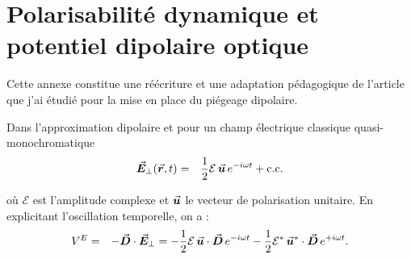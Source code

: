 \chapter{Polarisabilité dynamique et potentiel dipolaire optique}
\label{annex:dipolaire}
\minitoc

Cette annexe constitue une réécriture et une adaptation pédagogique de l’article \cite{Le_Kien_2013} que j’ai étudié pour la mise en place du piégeage dipolaire.

\medskip


Dans l’approximation dipolaire et pour un champ électrique classique quasi-monochromatique
\begin{eqnarray}
	\vec{{\bm{E}}}_\perp(\vec{{\bm{r}}},t) & = &\frac{1}{2}\mathcal{E}\,\vec{{\bm{u}}}\,e^{-i\omega t} + \text{c.c.}\label{chap:dipolaire:eq:elec.2}	
\end{eqnarray}

où $\mathcal{E}$ est l’amplitude complexe et $\vec{{\bm{u}}}$ le vecteur de polarisation unitaire.%
En explicitant l’oscillation temporelle, on a :
\begin{eqnarray*}
	V^E & = & -\vec{{\bm{D}}}\cdot\vec{{\bm{E}}}_\perp = -\frac{1}{2}\mathcal{E}\,\vec{{\bm{u}}}\cdot\vec{{\bm{D}}}\,e^{-i\omega t} - \frac{1}{2}\mathcal{E}^\ast\,\vec{{\bm{u}}}^*\cdot\vec{{\bm{D}}}\,e^{+i\omega t}.
\end{eqnarray*}

